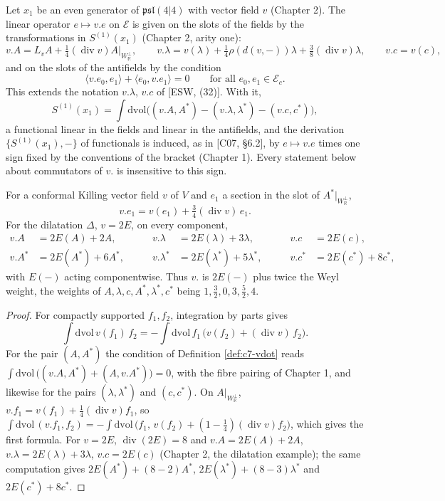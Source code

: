 \begin{definition}
\label{def:c7-vdot}
Let $x_1$ be an even generator of $\mathfrak{psl}(4|4)$ with vector field $v$ (Chapter 2). The linear operator $e\mapsto v.e$ on $\mathscr E$ is given on the slots of the fields by the transformations in $S^{(1)}(x_1)$ (Chapter 2, arity one):
\[
v.A=L_vA+\tfrac14(\operatorname{div}v)A|_{W_{\mathbb R}^\perp},\qquad v.\lambda=v(\lambda)+\tfrac14\rho(d(v,-))\lambda+\tfrac38(\operatorname{div}v)\lambda,\qquad v.c=v(c),
\]
and on the slots of the antifields by the condition
\[
\langle v.e_0,e_1\rangle+\langle e_0,v.e_1\rangle=0\qquad\text{for all }e_0,e_1\in\mathscr E_c .
\]
This extends the notation $v.\lambda$, $v.c$ of [ESW, (32)]. With it,
\[
S^{(1)}(x_1)=\int\mathrm{dvol}\Big((v.A,A^*)-(v.\lambda,\lambda^*)-(v.c,c^*)\Big),
\]
a functional linear in the fields and linear in the antifields, and the derivation $\{S^{(1)}(x_1),-\}$ of functionals is induced, as in [C07, §6.2], by $e\mapsto v.e$ times one sign fixed by the conventions of the bracket (Chapter 1). Every statement below about commutators of $v.$ is insensitive to this sign.
\end{definition}

\begin{lemma}
\label{lem:c7-weights}
For a conformal Killing vector field $v$ of $V$ and $e_1$ a section in the slot of $A^*|_{W_{\mathbb R}^\perp}$,
\[
v.e_1=v(e_1)+\tfrac34(\operatorname{div}v)\,e_1 .
\]
For the dilatation $\Delta$, $v=2E$, on every component,
\[
\begin{aligned}
v.A&=2E(A)+2A,&\qquad v.\lambda&=2E(\lambda)+3\lambda,&\qquad v.c&=2E(c),\\
v.A^*&=2E(A^*)+6A^*,&\qquad v.\lambda^*&=2E(\lambda^*)+5\lambda^*,&\qquad v.c^*&=2E(c^*)+8c^*,
\end{aligned}
\]
with $E(-)$ acting componentwise. Thus $v.$ is $2E(-)$ plus twice the Weyl weight, the weights of $A,\lambda,c,A^*,\lambda^*,c^*$ being $1,\tfrac32,0,3,\tfrac52,4$.
\end{lemma}

\begin{proof}
For compactly supported $f_1,f_2$, integration by parts gives
\[
\int\mathrm{dvol}\,v(f_1)\,f_2=-\int\mathrm{dvol}\,f_1\,\big(v(f_2)+(\operatorname{div}v)\,f_2\big).
\]
For the pair $(A,A^*)$ the condition of Definition \ref{def:c7-vdot} reads $\int\mathrm{dvol}\,\big((v.A,A^*)+(A,v.A^*)\big)=0$, with the fibre pairing of Chapter 1, and likewise for the pairs $(\lambda,\lambda^*)$ and $(c,c^*)$. On $A|_{W_{\mathbb R}^\perp}$, $v.f_1=v(f_1)+\tfrac14(\operatorname{div}v)f_1$, so $\int\mathrm{dvol}\,(v.f_1,f_2)=-\int\mathrm{dvol}\,\big(f_1,\,v(f_2)+(1-\tfrac14)(\operatorname{div}v)f_2\big)$, which gives the first formula. For $v=2E$, $\operatorname{div}(2E)=8$ and $v.A=2E(A)+2A$, $v.\lambda=2E(\lambda)+3\lambda$, $v.c=2E(c)$ (Chapter 2, the dilatation example); the same computation gives $2E(A^*)+(8-2)A^*$, $2E(\lambda^*)+(8-3)\lambda^*$ and $2E(c^*)+8c^*$.
\end{proof}


